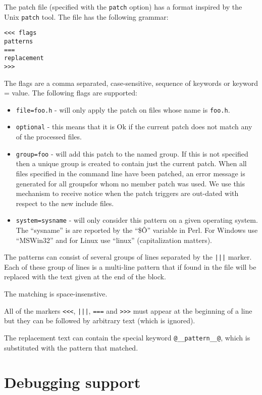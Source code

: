 \documentclass{article}
\def\t#1{{\tt #1}}
\begin{document}
 The patch file (specified with the \t{patch} option) has a format inspired by
the Unix \t{patch} tool. The file has the following grammar:

\begin{verbatim}
<<< flags
patterns
===
replacement
>>>
\end{verbatim}

 The flags are a comma separated, case-sensitive, sequence of keywords or
keyword = value. The following flags are supported:
\begin{itemize}
\item \t{file=foo.h} - will only apply the patch on files whose name is
                       \t{foo.h}. 
\item \t{optional} - this means that it is Ok if the current patch does not
match any of the processed files. 
\item \t{group=foo} - will add this patch to the named group. If this is not
specified then a unique group is created to contain just the current patch.
When all files specified in the command line have been patched, an error
message is generated for all groupsfor whom no member patch was used. We use
this mechanism to receive notice when the patch triggers are out-dated with
respect to the new include files. 
\item \t{system=sysname} - will only consider this pattern on a given
operating system. The ``sysname'' is are reported by the ``\$\^O'' variable in
Perl. For Windows use ``MSWin32'' and for Linux use ``linux'' (capitalization
matters).
\end{itemize}


 The patterns can consist of several groups of lines separated by the \t{|||}
marker. Each of these group of lines is a multi-line pattern that if found in
the file will be replaced with the text given at the end of the block. 

 The matching is space-insenstive.

 All of the markers \t{<<<}, \t{|||}, \t{===} and \t{>>>} must appear at the
beginning of a line but they can be followed by arbitrary text (which is
ignored).

 The replacement text can contain the special keyword \t{@\_\_pattern\_\_@},
which is substituted with the pattern that matched. 


\section{Debugging support}\label{sec-debugger}
\end{document}
